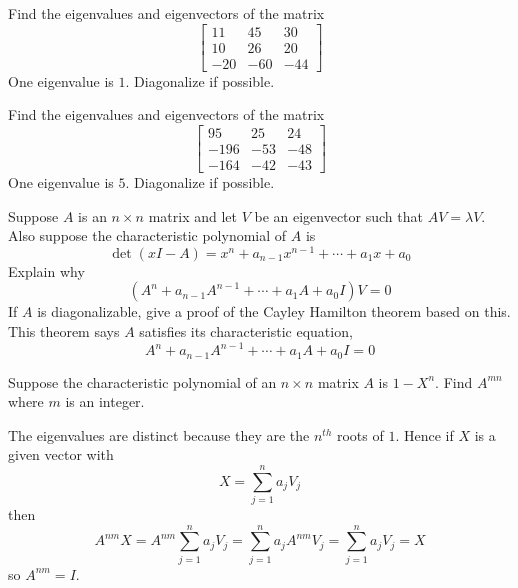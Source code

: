 \documentclass{ximera}
\begin{document}
\begin{problem}\label{prb:8.24} Find the eigenvalues and eigenvectors of the matrix
\begin{equation*}
\left[
\begin{array}{rrr}
11 & 45 & 30 \\
10 & 26 & 20 \\
-20 & -60 & -44
\end{array}
\right]
\end{equation*}
One eigenvalue is $1.$ Diagonalize if possible.
\end{problem}

\begin{problem}\label{prb:8.25} Find the eigenvalues and eigenvectors of the matrix
\begin{equation*}
\left[
\begin{array}{rrr}
95 & 25 & 24 \\
-196 & -53 & -48 \\
-164 & -42 & -43
\end{array}
\right]
\end{equation*}
One eigenvalue is $5.$ Diagonalize if possible.
\end{problem}

\begin{problem}\label{prb:8.26} Suppose $A$ is an $n\times n$ matrix and let $V$ be an
eigenvector such that $AV=\lambda V$. Also suppose the
characteristic polynomial of $A$ is
\begin{equation*}
\det \left( x I-A\right) =x ^{n}+a_{n-1} x ^{n-1}+\cdots
+a_{1}x +a_{0}
\end{equation*}
Explain why
\begin{equation*}
\left( A^{n}+a_{n-1}A^{n-1}+\cdots +a_{1}A+a_{0}I\right) V=0
\end{equation*}
If $A$ is diagonalizable, give a proof of the Cayley Hamilton
theorem based on this. This theorem says $A$ satisfies its
characteristic equation,
\begin{equation*}
A^{n}+a_{n-1}A^{n-1}+\cdots +a_{1}A+a_{0}I=0
\end{equation*}
\end{problem}

\begin{problem}\label{prb:8.27} Suppose the characteristic polynomial of an $n\times n$ matrix $A$ is
$1-X ^{n}$. Find $A^{mn}$ where $m$ is an integer.
\begin{hint}
The eigenvalues are distinct because
they are the $n^{th}$ roots of $1$. Hence if $X$ is a given vector with
\[
X=\sum_{j=1}^{n}a_{j}V_{j}
\]
then
\[
A^{nm}X=A^{nm}\sum_{j=1}^{n}a_{j}V_{j}=
\sum_{j=1}^{n}a_{j}A^{nm}V_{j}=\sum_{j=1}^{n}a_{j}V_{j}=X
\]
so $A^{nm}=I$.
\end{hint}
\end{problem}
\end{document}
